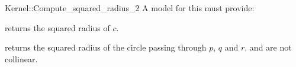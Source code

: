 \begin{ccRefFunctionObjectConcept}{Kernel::Compute_squared_radius_2}
A model for this must provide:


       {returns the squared radius of $c$. }

       {returns the squared radius of the circle passing through $p$, $q$
       and $r$. \ccPrecond {} and  are not collinear.}

\end{ccRefFunctionObjectConcept}
